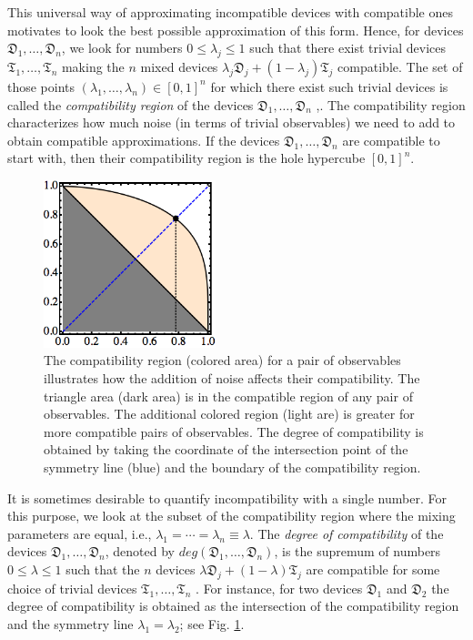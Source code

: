 \documentclass[12pt]{article}
\theoremstyle{definition}
\newcommand{\Dev}{\mathfrak{D}} %
\newcommand{\Triv}{\mathfrak{T}} %
\begin{document}
This universal way of approximating incompatible devices with compatible ones motivates to look the best possible approximation of this form. 
Hence, for devices $\Dev_1,\ldots,\Dev_n$, we look for numbers $0\leq \lambda_j \leq 1$ such that there exist trivial devices $\Triv_1,\ldots,\Triv_n$ making the $n$ mixed devices 
$\lambda_j \Dev_j + (1-\lambda_j) \Triv_j$ compatible. 
The set of those points $(\lambda_1,\ldots,\lambda_n)\in [0,1]^n$ for which there exist such trivial devices is called the \emph{compatibility region} of the devices $\Dev_1,\ldots,\Dev_n$ \cite{BuHeScSt13},\cite{Gudder13}.
The compatibility region characterizes how much noise (in terms of trivial observables) we need to add to obtain compatible approximations.
If the devices $\Dev_1,\ldots,\Dev_n$ are compatible to start with, then their compatibility region is the hole hypercube $[0,1]^n$.

\begin{figure}\begin{center}
\includegraphics[width=5cm]{fig_region.png}
\caption{The compatibility region (colored area) for a pair of observables illustrates how the addition of noise affects their compatibility. The triangle area (dark area) is in the compatible region of any pair of observables. 
The additional colored region (light are) is greater for more compatible pairs of observables. 
The degree of compatibility is obtained by taking the coordinate of the intersection point of the symmetry line (blue) and the boundary of the compatibility region.}
\label{fig:degree}
\end{center}
\end{figure}

It is sometimes desirable to quantify incompatibility with a single number.
For this purpose, we look at the subset of the compatibility region where the mixing parameters are equal, i.e.,  $\lambda_1=\cdots =\lambda_n \equiv\lambda$.
The \emph{degree of compatibility} of the devices $\Dev_1,\ldots,\Dev_n$, denoted by $deg(\Dev_1,\ldots,\Dev_n)$, is the supremum of numbers $0\leq \lambda \leq 1$ such that the $n$ devices 
$\lambda \Dev_j + (1-\lambda) \Triv_j$ are compatible for some choice of trivial devices $\Triv_1,\ldots,\Triv_n$ \cite{HeScToZi14}.
For instance, for two devices $\Dev_1$ and $\Dev_2$ the degree of compatibility is obtained as the intersection of the compatibility region and the symmetry line $\lambda_1=\lambda_2$; see Fig. \ref{fig:degree}. 
\end{document}
